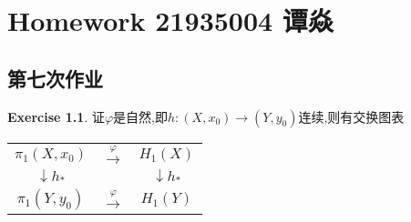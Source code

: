 \documentclass[a4paper]{book}
\makeatletter
\newcommand{\voidenvironment}[1]{%
  \expandafter\providecommand\csname env@#1@save@env\endcsname{}%
  \expandafter\providecommand\csname env@#1@process\endcsname{}%
  \@ifundefined{#1}{}{\RenewEnviron{#1}{}}%
}
\numberwithin{equation}{chapter}
\theoremstyle{definition}
\newtheorem{exc}[exm]{Exercise}
\makeatother
\begin{document}
\pagestyle{empty}
% 



\setcounter{chapter}{3}




\chapter{Homework 21935004 谭焱}



\section{第七次作业}\label{sec:1}



\begin{exc}
  证$\varphi$是自然,即$h:(X,x_0) \rightarrow (Y,y_0)$连续,则有交换图表
\begin{center}
  \begin{tabular}{ccc}
        $\pi_1(X,x_0)$ & $\overset{\varphi}{\longrightarrow}$ & $H_1(X)$ \\
        $\downarrow h_*$ &                     &$\downarrow h_*      $\\
        $\pi_1(Y,y_0) $ & $\overset{\varphi}{\longrightarrow}$ &$ H_1(Y)$
  \end{tabular}
  \end{center}
\end{exc}
\end{document}
